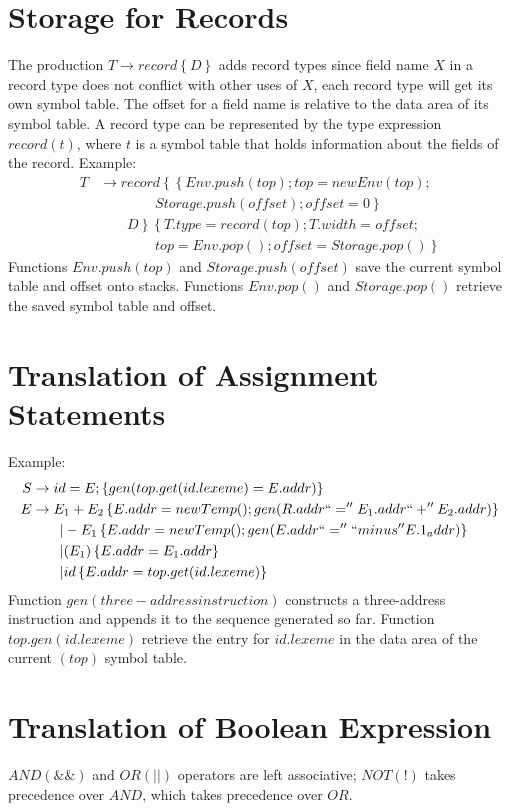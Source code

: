 \section{Storage for Records}
The production $T \to record\left\{D\right\}$ adds record types since field name $X$ in a record type does not conflict with other uses of $X$, each record type will get its own symbol table.
The offset for a field name is relative to the data area of its symbol table.
A record type can be represented by the type expression $record(t)$, where $t$ is a symbol table that holds information about the fields of the record.
Example:
\begin{align*}
	T &\to record\left\{\left\{Env.push(top); top = new Env(top); \right.\right. \\
			&\qquad \qquad \left.\left. Storage.push(offset); offset = 0\right\} \right. \\
		&\qquad \left. D\right\} \left\{T.type = record(top); T.width = offset; \right. \\
			&\qquad \qquad \left. top = Env.pop(); offset = Storage.pop()\right\}
\end{align*}
Functions $Env.push(top)$ and $Storage.push(offset)$ save the current symbol table and offset onto stacks.
Functions $Env.pop()$ and $Storage.pop()$ retrieve the saved symbol table and offset.

\section{Translation of Assignment Statements}
Example:
\begin{align*}
	S &\to id = E; \left\{gen(top.get(id.lexeme) = E.addr)\right\} \\
	E &\to E_1 + E_2 \left\{E.addr = new Temp(); gen(R.addr ``='' E_1.addr ``+'' E_2.addr)\right\} \\
	&\qquad| -E_1 \left\{E.addr = new Temp(); gen(E.addr ``='' ``minus'' E.1_addr)\right\} \\
	&\qquad| (E_1) \left\{E.addr = E_1.addr\right\} \\
	&\qquad| id \left\{E.addr = top.get(id.lexeme)\right\}
\end{align*}
Function $gen(three-address instruction)$ constructs a three-address instruction and appends it to the sequence generated so far.
Function $top.gen(id.lexeme)$ retrieve the entry for $id.lexeme$ in the data area of the current $(top)$ symbol table.

\section{Translation of Boolean Expression}
$AND(\&\&)$ and $OR(||)$ operators are left associative; $NOT(!)$ takes precedence over $AND$, which takes precedence over $OR$.

